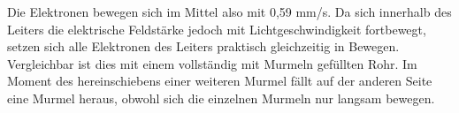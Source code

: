 {\begin{bsp}{}{}
Die Elektronen bewegen sich im Mittel also mit 0,59 mm/s. Da sich innerhalb des Leiters die elektrische Feldstärke
jedoch mit Lichtgeschwindigkeit fortbewegt, setzen sich alle Elektronen des Leiters praktisch gleichzeitig in Bewegen.
Vergleichbar ist dies mit einem vollständig mit Murmeln gefüllten Rohr. Im Moment des hereinschiebens einer weiteren 
Murmel fällt auf der anderen Seite eine Murmel heraus, obwohl sich die einzelnen Murmeln nur langsam bewegen. 






\end{bsp}

}


\newpage









